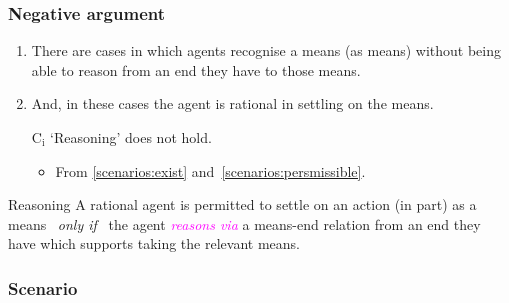 \documentclass[noamssymb,
]{beamer} %
\newcommand{\hozlinedash}[0]{%
  \noindent\hdashrule[0.5ex][c]{\textwidth}{.1pt}{2.5pt}
}
\begin{document}
\begin{frame}
  \frametitle{Negative argument}

  \begin{enumerate}
  \item\label{scenarios:exist} There are cases in which agents recognise a means (as means) without being able to reason from an end they have to those means.
  \item\label{scenarios:persmissible} And, in these cases the agent is rational in settling on the means.

  \item[C\(_{\text{i}}\)] `Reasoning' does not hold.
    \begin{itemize}
    \item From \ref{scenarios:exist} and~\ref{scenarios:persmissible}.
    \end{itemize}
  \end{enumerate}

  \hozlinedash
  {\footnotesize
    \begin{block}{Reasoning}
      A rational agent is permitted to settle on an action (in part) as a means
      \newline
      \mbox{ }\hfill\emph{only if}\hfill\mbox{ }
      \newline
      the agent \textcolor{fuchsia}{\emph{reasons via}}  a means-end relation from an end they have which supports taking the relevant means.
    \end{block}
  }
\end{frame}

\subsubsection{Scenario}
\label{sec:case}
\end{document}
